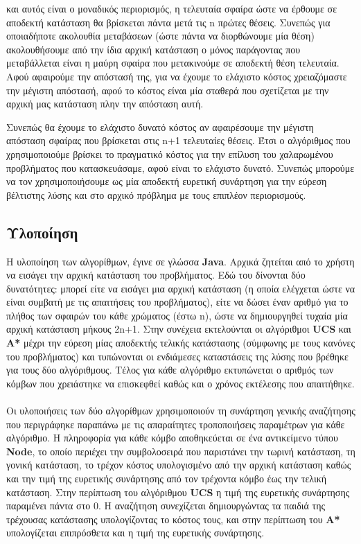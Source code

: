 \documentclass{article}
\begin{document}
και αυτός είναι ο μοναδικός περιορισμός, η τελευταία σφαίρα ώστε να έρθουμε σε αποδεκτή κατάσταση θα βρίσκεται πάντα μετά τις n πρώτες θέσεις. Συνεπώς για οποιαδήποτε ακολουθία μεταβάσεων (ώστε πάντα να διορθώνουμε μία θέση) ακολουθήσουμε από την ίδια αρχική κατάσταση ο μόνος παράγοντας που μεταβάλλεται είναι η μαύρη σφαίρα που μετακινούμε σε αποδεκτή θέση τελευταία. Αφού αφαιρούμε την απόστασή της, για να έχουμε το ελάχιστο κόστος χρειαζόμαστε την μέγιστη απόστασή, αφού το κόστος είναι μία σταθερά που σχετίζεται με την αρχική μας κατάσταση πλην την απόσταση αυτή. \par
Συνεπώς θα έχουμε το ελάχιστο δυνατό κόστος αν αφαιρέσουμε την μέγιστη απόσταση σφαίρας που βρίσκεται στις n+1 τελευταίες θέσεις. Έτσι ο αλγόριθμος που χρησιμοποιούμε βρίσκει το πραγματικό κόστος για την επίλυση του χαλαρωμένου προβλήματος που κατασκευάσαμε, αφού είναι το ελάχιστο δυνατό. Συνεπώς μπορούμε να τον χρησιμοποιήσουμε ως μία αποδεκτή ευρετική συνάρτηση για την εύρεση βέλτιστης λύσης και στο αρχικό πρόβλημα με τους επιπλέον περιορισμούς.

    \subsection*{Υλοποίηση}
        Η υλοποίηση των αλγορίθμων, έγινε σε γλώσσα \textbf{Java}. Αρχικά ζητείται από το χρήστη να εισάγει την αρχική κατάσταση του προβλήματος. Εδώ του δίνονται δύο δυνατότητες: μπορεί είτε να εισάγει μια αρχική κατάσταση (η οποία ελέγχεται ώστε να είναι συμβατή με τις απαιτήσεις του προβλήματος), είτε να δώσει έναν αριθμό για το πλήθος των σφαιρών του κάθε χρώματος (έστω n), ώστε να δημιουργηθεί τυχαία μία αρχική κατάσταση μήκους 2n+1. Στην συνέχεια εκτελούνται οι αλγόριθμοι \textbf{UCS} και \textbf{A*} μέχρι την εύρεση μίας αποδεκτής τελικής κατάστασης (σύμφωνης με τους κανόνες του προβλήματος) και τυπώνονται οι ενδιάμεσες καταστάσεις της λύσης που βρέθηκε για τους δύο αλγόριθμους. Τέλος για κάθε αλγόριθμο εκτυπώνεται ο αριθμός των κόμβων που χρειάστηκε να επισκεφθεί καθώς και ο χρόνος εκτέλεσης που απαιτήθηκε.\\\\
        Οι υλοποιήσεις των δύο αλγορίθμων χρησιμοποιούν τη συνάρτηση γενικής αναζήτησης που περιγράφηκε παραπάνω με τις απαραίτητες τροποποιήσεις παραμέτρων για κάθε αλγόριθμο. Η πληροφορία για κάθε κόμβο αποθηκεύεται σε ένα αντικείμενο τύπου \textbf{Node}, το οποίο περιέχει την συμβολοσειρά που παριστάνει την τωρινή κατάσταση, τη γονική κατάσταση, το τρέχον κόστος υπολογισμένο από την αρχική κατάσταση καθώς και την τιμή της ευρετικής συνάρτησης από τον τρέχοντα κόμβο έως την τελική κατάσταση. Στην περίπτωση του αλγόριθμου \textbf{UCS} η τιμή της ευρετικής συνάρτησης παραμένει πάντα στο 0. Η αναζήτηση συνεχίζεται δημιουργώντας τα παιδιά της τρέχουσας κατάστασης υπολογίζοντας το κόστος τους, και στην περίπτωση του \textbf{Α*} υπολογίζεται επιπρόσθετα και η τιμή της ευρετικής συνάρτησης.\\\\
        
\end{document}
